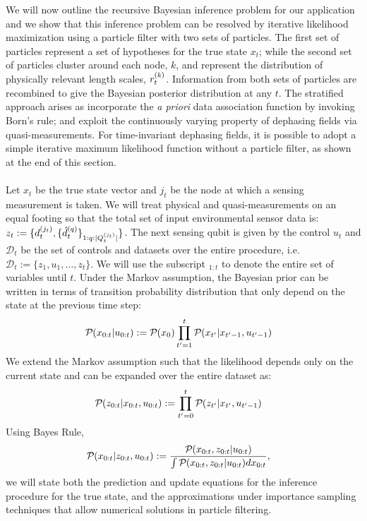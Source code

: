 We will now outline the recursive Bayesian inference problem for our application and we show that this inference problem can be resolved by iterative likelihood maximization using a particle filter with two sets of particles. The first set of particles represent a set of hypotheses for the true state $x_t$; while the second set of particles cluster around each node, $k$, and represent the distribution of physically relevant length scales, $r^{( k )}_{t}$. Information from both sets of particles are recombined to give the Bayesian posterior distribution at any $t$. The stratified approach arises as  incorporate the \textit{a priori} data association function by invoking Born's rule; and exploit the continuously varying property of dephasing fields via quasi-measurements. For time-invariant dephasing fields, it is possible to adopt a simple iterative maximum likelihood function without a particle filter, as shown at the end of this section. \\
\\
Let $x_t$ be the true state vector and $j_t$ be the node at which a sensing measurement is taken. We will treat physical and quasi-measurements on an equal footing so that the total set of input environmental sensor data is: $z_t := \{d^{( j_t )}_{t}, \{ \hat{d}^{( q )}_{t} \}_{1:q:|Q^{( j_t )}_{t}|}\}$. The next sensing qubit is given by the control $u_t$ and $\mathcal{D}_t$ be the set of controls and datasets over the entire procedure, i.e. $\mathcal{D}_t := \{z_1, u_1, \hdots, z_t \}$.  We will use the subscript ${}_{1:t}$ to denote the entire set of variables until $t$. Under the Markov assumption, the Bayesian prior can be written in terms of transition probability distribution that only depend on the state at the previous time step:
\begin{align}
\mathcal{P}_{} ( x_{0:t} | u_{0:t} ) & := \mathcal{P}_{} ( x_{0} ) \prod_{t'=1}^{t} \mathcal{P}_{} ( x_{t'}| x_{t'-1}, u_{t'-1}   ) 
\end{align} We extend the Markov assumption such that the likelihood depends only on the current state and can be expanded over the entire dataset as:
\begin{align}
\mathcal{P}_{} ( z_{0:t} | x_{0:t}, u_{0:t} ) & := \prod_{t'=0}^{t} \mathcal{P}_{} ( z_{t'} | x_{t'}, u_{t'-1}  ) 
\end{align}  Using Bayes Rule,
\begin{align}
\mathcal{P}_{} ( x_{0:t} | z_{0:t} , u_{0:t} ) &:= \frac{\mathcal{P}_{} ( x_{0:t} , z_{0:t} | u_{0:t} )}{\int \mathcal{P}_{} ( x_{0:t} , z_{0:t} | u_{0:t} ) dx_{0:t}}, 
\end{align} we will state both the prediction and update equations for the inference procedure for the true state, and the approximations under importance sampling techniques that allow numerical solutions  in particle filtering. \\
